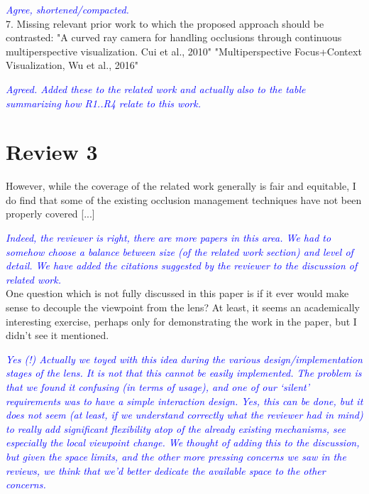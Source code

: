 \documentclass[a4paper,10pt]{article}
\newcommand{\rr}[1]{\emph{\textcolor{blue}{#1}}}
\begin{document}
    \rr{Agree, shortened/compacted.}\\
    
    7. Missing relevant prior work to which the proposed approach should be
    contrasted:
    "A curved ray camera for handling occlusions through continuous multiperspective
    visualization. Cui et al., 2010"
    "Multiperspective Focus+Context Visualization, Wu et al., 2016"

    \rr{Agreed. Added these to the related work and actually also to the table summarizing how R1..R4 relate to this work.}\\    
    

\section{Review 3}

    However, while the coverage of the related work generally is fair and equitable, I
    do find that some of the existing occlusion management techniques have not been
    properly covered [...]
 
    \rr{Indeed, the reviewer is right, there are more papers in this area. We had to somehow choose a balance between size (of the related work section) and level of detail. We have added the citations suggested by the reviewer to the discussion of related work.}\\
    
    One question
    which is not fully discussed in this paper is if it ever would make sense to
    decouple the viewpoint from the lens? At least, it seems an academically
    interesting exercise, perhaps only for demonstrating the work in the paper, but I
    didn't see it mentioned.
    
    \rr{Yes (!) Actually we toyed with this idea during the various design/implementation stages of the lens. It is not that this cannot be easily implemented. The problem is that we found it confusing (in terms of usage), and one of our `silent' requirements was to have a simple interaction design. Yes, this can be done, but it does not seem (at least, if we understand correctly what the reviewer had in mind) to really add significant flexibility atop of the already existing mechanisms, see especially the local viewpoint change. We thought of adding this to the discussion, but given the space limits, and the other more pressing concerns we saw in the reviews, we think that we'd better dedicate the available space to the other concerns.}\\
    
\end{document}

